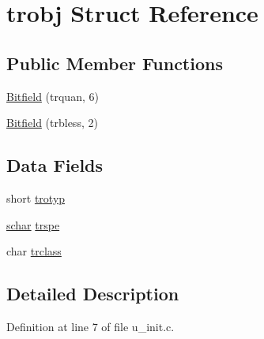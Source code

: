 \hypertarget{structtrobj}{\section{trobj Struct Reference}
\label{structtrobj}
}
\subsection*{Public Member Functions}
\begin{DoxyCompactItemize}
\item 
\hyperlink{structtrobj_adefd4aa3765b5e580bb06a69b3d8a409}{Bitfield} (trquan, 6)
\item 
\hyperlink{structtrobj_aa23a700e7c0024ac75664d20c501b770}{Bitfield} (trbless, 2)
\end{DoxyCompactItemize}
\subsection*{Data Fields}
\begin{DoxyCompactItemize}
\item 
short \hyperlink{structtrobj_a9553fe12991c5faec24c2c27854ac23d}{trotyp}
\item 
\hyperlink{config_8h_a0fd9ce9d735064461bebfe6037026093}{schar} \hyperlink{structtrobj_a7faa17ba21618ea077821199e4d3411d}{trspe}
\item 
char \hyperlink{structtrobj_a87657037180c895e780ef8e96c97d3d0}{trclass}
\end{DoxyCompactItemize}


\subsection{Detailed Description}


Definition at line 7 of file u\+\_\+init.\+c.



